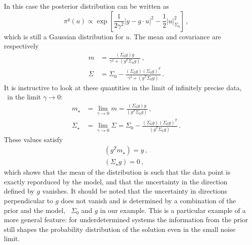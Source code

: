 In this case the posterior distribution can be written as
\begin{equation}
  \label{eq:GaussPostExplicit}
    \pi^y(u) \propto \exp \left[
    \frac{1}{2\gamma^2} \left|y - g \cdot u \right|^2 - \frac12 \left|
      u
    \right|_{\Sigma_0}^2 
    \right]\, ,
\end{equation}
which is still a Gaussian distribution for $u$. The mean and covariance are
respectively
\begin{align}
  m &= \frac{(\Sigma_0 g) y}{\gamma^2 + (g^T \Sigma_0 g)}\, , \\
  \Sigma &= \Sigma_0 - 
  \frac{(\Sigma_0 g) (\Sigma_0 g)^T}{\gamma^2 + (g^T \Sigma_0 g)}\, .
\end{align}
It is instructive to look at these quantities in the limit of infinitely precise data, \ie\ in the limit $\gamma\to 0$:
\begin{align}
  m_\star &= 
  \lim_{\gamma\to 0} m
  = \frac{(\Sigma_0 g) y}{(g^T \Sigma_0 g)}\, , \\
  \Sigma_\star &= 
  \lim_{\gamma\to 0} \Sigma 
  = \Sigma_0 - 
  \frac{(\Sigma_0 g) (\Sigma_0 g)^T}{(g^T \Sigma_0 g)}\, .
\end{align}
These values satisfy
\begin{align}
  (g^T m_\star) = y \, , \\
  (\Sigma_\star g) = 0 \, ,
\end{align}
which shows that the mean of the distribution is such that the data point is
exactly reporduced by the model, and that the uncertainty in the direction
defined by $g$ vanishes. It should be noted that the uncertainty in directions
perpendicular to $g$ does not vanish and is determined by a combination of the
prior and the model, \viz\ $\Sigma_0$ and $g$ in our example. This is a
particular example of a more general feature: for underdetermined systems the
information from the prior still shapes the probability distribution of the
solution even in the small noise limit.  

